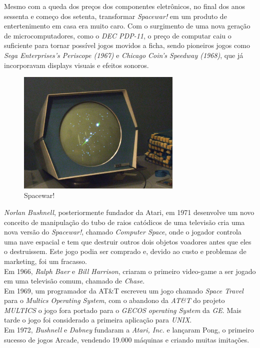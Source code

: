 \documentclass[paper=a4, fontsize=11pt]{scrartcl}	%
\numberwithin{equation}{section}															%
\numberwithin{figure}{section}																%
\numberwithin{table}{section}																%
\begin{document}
Mesmo com a queda dos preços dos componentes eletrônicos, no final dos anos sessenta e começo dos setenta, transformar \textit{Spacewar!} em um produto de entertenimento em casa era muito caro. Com o surgimento de uma nova geração de microcomputadores, como o \textit{DEC PDP-11}, o preço de computar caiu o suficiente para tornar possível jogos movidos a ficha, sendo pioneiros jogos como \textit{Sega Enterprises's Periscope (1967)} e \textit{Chicago Coin's Speedway (1968)}, que já incorporavam displays visuais e efeitos sonoros.\\
\begin{figure}[h!]
	\centering
    \includegraphics[width=0.7\textwidth]{img/spacewar}
    \caption{Spacewar!}
\end{figure}
\textit{Norlan Bushnell}, posteriormente fundador da Atari, em 1971 desenvolve um novo conceito de manipulação do tubo de raios catódicos de uma televisão cria uma nova versão do \textit{Spacewar!}, chamado \textit{Computer Space}, onde o jogador controla uma nave espacial e tem que destruir outros dois objetos voadores antes que eles o destruissem. Este jogo podia ser comprado e, devido ao custo e problemas de marketing, foi um fracasso.\\
Em 1966, \textit{Ralph Baer} e \textit{Bill Harrison}, criaram o primeiro video-game a ser jogado em uma televisão comum, chamado de \textit{Chase}.\\
Em 1969, um programador da AT\&T escreveu um jogo chamado \textit{Space Travel} para o \textit{Multics Operating System}, com o abandono da \textit{AT\&T} do projeto \textit{MULTICS} o jogo fora portado para o \textit{GECOS operating System} da \textit{GE}. Mais tarde o jogo foi considerado a primeira aplicação para \textit{UNIX}.\\
Em 1972, \textit{Bushnell} e \textit{Dabney} fundaram a \textit{Atari, Inc.} e lançaram Pong, o primeiro sucesso de jogos Arcade, vendendo 19.000 máquinas e criando muitas imitações.\\
\end{document}
